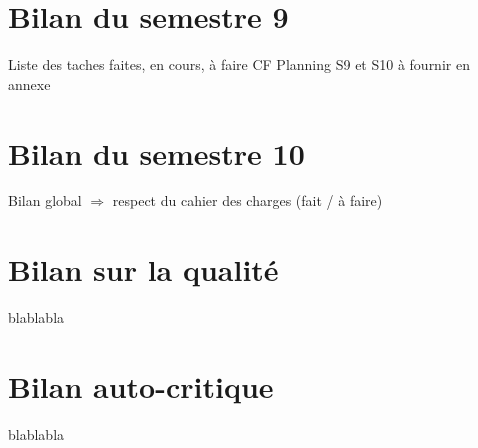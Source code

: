\documentclass{polytech/polytech}
\numberwithin{figure}{chapter}
\begin{document}
\section{Bilan du semestre 9}

Liste des taches faites, en cours, à faire
CF Planning S9 et S10 à fournir en annexe

\section{Bilan du semestre 10}

Bilan global $\Rightarrow$ respect du cahier des charges (fait / à faire)

\section{Bilan sur la qualité }
blablabla

\section{Bilan auto-critique}
blablabla
\end{document}
